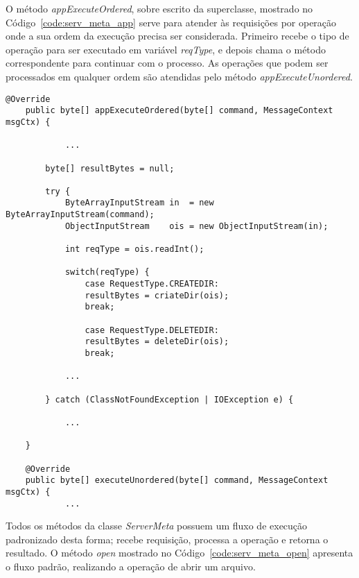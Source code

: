 O método \textit{appExecuteOrdered}, sobre escrito da superclasse, mostrado no Código~\ref{code:serv_meta_app} serve para atender às requisições por operação onde a sua ordem da execução precisa ser considerada.
Primeiro recebe o tipo de operação para ser executado em variável \textit{reqType}, e depois chama o método correspondente para continuar com o processo.
As operações que podem ser processados em qualquer ordem são atendidas pelo método \textit{appExecuteUnordered}.

\begin{lstlisting}[basicstyle=\ttfamily\footnotesize, frame=single, caption=Métodos para atender às requisições, label=code:serv_meta_app ]		
	@Override
	public byte[] appExecuteOrdered(byte[] command, MessageContext msgCtx) {
				
			...
				
		byte[] resultBytes = null;
		
		try {
			ByteArrayInputStream in  = new ByteArrayInputStream(command);
			ObjectInputStream    ois = new ObjectInputStream(in);
			
			int reqType = ois.readInt();
			
			switch(reqType) {
				case RequestType.CREATEDIR:
				resultBytes = criateDir(ois);
				break;
				
				case RequestType.DELETEDIR:
				resultBytes = deleteDir(ois);
				break;
	
			...
				
		} catch (ClassNotFoundException | IOException e) {
	
			...
			
	}
			
	@Override
	public byte[] executeUnordered(byte[] command, MessageContext msgCtx) {	
			...
\end{lstlisting}	

Todos os métodos da classe \textit{ServerMeta} possuem um fluxo de execução padronizado desta forma; recebe requisição, processa a operação e retorna o resultado. 
O método \textit{open} mostrado no Código~\ref{code:serv_meta_open} apresenta o fluxo padrão, realizando a operação de abrir um arquivo.

